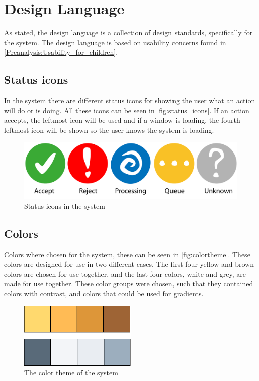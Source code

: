 \section{Design Language}
\label{design:design_language}
As stated, the design language is a collection of design standards, specifically for the \giraf[] system. 
The design language is based on usability concerns found in \autoref{Preanalysis:Usability_for_children}.

\subsection*{Status icons}
\label{design:state_icons}

In the \giraf[] system there are different status icons for showing the user what an action will do or is doing. All these icons can be seen in \autoref{fig:status_icons}. If an action accepts, the leftmost icon will be used and if a window is loading, the fourth leftmost icon will be shown so the user knows the system is loading.

\begin{figure}[h!]
	\centering
	\includegraphics[width=\textwidth]{gfx/status_icons}
	\caption{Status icons in the \giraf[] system}
	\label{fig:status_icons}
\end{figure}

\subsection*{Colors}
\label{design:giraf_colors}

Colors where chosen for the \giraf[] system, these can be seen in \autoref{fig:colortheme}. These colors are designed for use in two different cases. The first four yellow and brown colors are chosen for use together, and the last four colors, white and grey, are made for use together. 
These color groups were chosen, such that they contained colors with contrast, and colors that could be used for gradients.

\begin{figure}[h!]
	\centering
	\includegraphics[width=0.5\textwidth]{gfx/design_color_theme}
	\caption{The color theme of the \giraf[] system}
	\label{fig:colortheme}
\end{figure}

